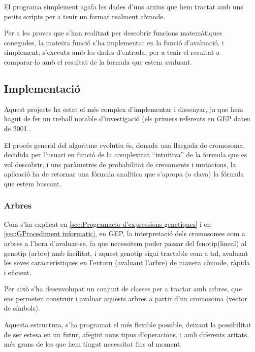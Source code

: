 El programa simplement agafa les dades d'uns arxius que hem tractat amb uns
petits scripts per a tenir un format realment còmode.

Per a les proves que s'han realitzat per descobrir funcions matemàtiques
conegudes, la mateixa funció s'ha implementat en la funció d'avaluació, i
simplement, s'executa amb les dades d'entrada, per a tenir el resultat a
comparar-lo amb el resultat de la formula que estem avaluant.


\subsection{Implementació} %
\label{sub:GImplementacio}

Aquest projecte ha estat el més complex d'implementar i dissenyar, ja que hem
hagut de fer un treball notable d'investigació (els primers referents en GEP
daten de 2001 \cite{ferreira:2001}.

El procés general del algoritme evolutiu és, donada una llargada de cromosoma,
decidida per l'usuari en funció de la complexitat ``intuitiva'' de la formula
que es vol descobrir, i uns paràmetres de probabilitat de creuaments i
mutacions, la aplicació ha de retornar una fórmula analítica que s'apropa (o
clava) la fórmula que estem buscant.


\subsubsection{Arbres} %
\label{ssub:Arbres}

Com s'ha explicat en \ref{sec:Programacio d'expressions genetiques} i en
\ref{sec:GProcediment informatic}, en GEP, la interpretació dels
cromosomes com a arbres a l'hora d'avaluar-se, fa que necessitem poder passar
del fenotip(lineal) al genotip (arbre) amb facilitat, i aquest genotip sigui
tractable com a tal, avaluant les seves característiques en l'entorn (avaluant
l'arbre) de manera còmode, ràpida i eficient.

Per això s'ha desenvolupat un conjunt de classes per a tractar amb arbres, que
ens permeten construir i avaluar aquests arbres a partir d'un cromosoma (vector
de símbols).

Aquesta estructura, s'ha programat el més flexible possible, deixant la
possibilitat de ser estesa en un futur, afegint nous tipus d'operacions, i amb
diferents aritats, més grans de les que hem tingut necessitat fins al moment.

